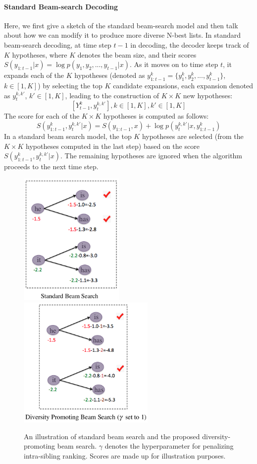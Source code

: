 \paragraph{Standard Beam-search Decoding}
Here, we first give a sketch of the standard beam-search model and then talk about how we can modify it to produce more diverse N-best lists. 
In standard beam-search decoding, 
 at time step $t-1$ in decoding, the decoder keeps track of $K$ hypotheses, where $K$ denotes the beam size, and their scores $S(y_{1:t-1}|x)=\log p(y_1,y_2,...,y_{t-1}|x)$. As it moves on to time step $t$,
it expands each of the $K$ hypotheses
(denoted as $y_{1:t-1}^k=\{y_1^k,y_2^k,...,y_{t-1}^k\}$, $k\in [1,K]$)
 by selecting the top $K$ candidate expansions,  each expansion
 denoted as  $y_t^{k,k'}$, $k'\in [1,K]$,
  leading to the construction of $K\times K$ new hypotheses:
  $$[Y_{t-1}^k, y_t^{k,k'}], k\in [1,K], k'\in [1,K]$$
The score for each of the $K\times K$ hypotheses is computed as follows:
\begin{equation}
S(y_{1:t-1}^k,y_t^{k,k'}|x)=S(y_{1:t-1},x)+\log p(y_t^{k,k'}|x,y_{1:t-1}^k)
\end{equation}
In a standard beam search model, the top $K$ 
hypotheses are selected
(from the $K\times K$  hypotheses computed in the last step) based on 
the score $S(y_{1:t-1}^k,y_t^{k,k'}|x)$. The remaining hypotheses are ignored when the algorithm proceeds to the next time step.
\begin{figure}
\includegraphics[width=2in]{img/diverse1.png}
\includegraphics[width=2.6in]{img/diverse2.png}
\centering
\caption[Standard beam search vs the diversity-promoting beam search]{An illustration of standard beam search and the proposed diversity-promoting beam search. $\gamma$ denotes the hyperparameter for penalizing intra-sibling ranking. Scores are made up for illustration purposes. }
\label{figure}
\end{figure}




